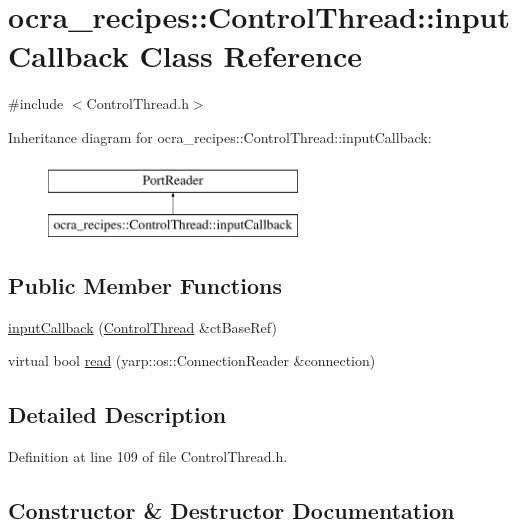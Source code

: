 \hypertarget{classocra__recipes_1_1ControlThread_1_1inputCallback}{}\section{ocra\+\_\+recipes\+:\+:Control\+Thread\+:\+:input\+Callback Class Reference}
\label{classocra__recipes_1_1ControlThread_1_1inputCallback}


{\ttfamily \#include $<$Control\+Thread.\+h$>$}

Inheritance diagram for ocra\+\_\+recipes\+:\+:Control\+Thread\+:\+:input\+Callback\+:\begin{figure}[H]
\begin{center}
\leavevmode
\includegraphics[height=2.000000cm]{d5/d79/classocra__recipes_1_1ControlThread_1_1inputCallback}
\end{center}
\end{figure}
\subsection*{Public Member Functions}
\begin{DoxyCompactItemize}
\item 
\hyperlink{classocra__recipes_1_1ControlThread_1_1inputCallback_a6dc341ad369c4c24c17932d525b98399}{input\+Callback} (\hyperlink{classocra__recipes_1_1ControlThread}{Control\+Thread} \&ct\+Base\+Ref)
\item 
virtual bool \hyperlink{classocra__recipes_1_1ControlThread_1_1inputCallback_a8c41c2ec6a86539d8bc0653fe79e3bec}{read} (yarp\+::os\+::\+Connection\+Reader \&connection)
\end{DoxyCompactItemize}


\subsection{Detailed Description}


Definition at line 109 of file Control\+Thread.\+h.



\subsection{Constructor \& Destructor Documentation}
\hypertarget{classocra__recipes_1_1ControlThread_1_1inputCallback_a6dc341ad369c4c24c17932d525b98399}{}\label{classocra__recipes_1_1ControlThread_1_1inputCallback_a6dc341ad369c4c24c17932d525b98399} 
